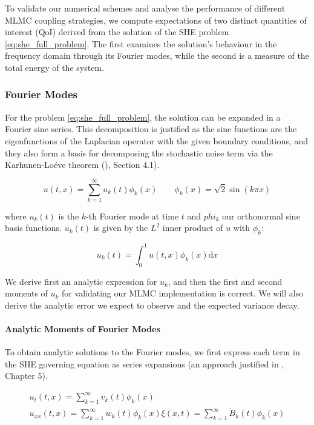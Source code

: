 To validate our numerical schemes and analyse the performance 
of different MLMC coupling strategies, we compute expectations
of two distinct quantities of interest (QoI) derived from the solution 
of the SHE problem \eqref{eq:she_full_problem}.
The first examines the solution's behaviour in the frequency domain through 
its Fourier modes, while the second is a measure of the total energy of the 
system. 

\subsubsection{Fourier Modes}

For the problem \eqref{eq:she_full_problem}, 
the solution can be expanded in a Fourier sine series. This 
decomposition is justified 
as the sine functions are the eigenfunctions of the Laplacian 
operator with the given boundary conditions, and they also form a basis 
for decomposing the stochastic noise term via the Karhunen-Loéve theorem
()\cite{da2014stochastic}, Section 4.1).

\begin{equation}
    u(t,x) = \sum_{k=1}^\infty u_k(t)\phi_k(x) \qquad \phi_k(x) = \sqrt{2}\sin (k\pi x)
\end{equation}

where $u_k(t)$ is the $k$-th Fourier mode at time $t$ and $phi_k$ our 
orthonormal sine basis functions. $u_k(t)$ is given by the $L^2$ 
inner product of $u$ with $\phi_k$:

\begin{equation}
    u_k(t) = \int_0^1 u(t,x)\phi_k(x)\mathrm{d}x
\end{equation}

We derive first an analytic expression for $u_k$, 
and then the first and second moments of $u_k$ for validating our 
MLMC implementation is correct. We will also derive the 
analytic error we expect to observe and 
the expected variance decay. 

\paragraph{Analytic Moments of Fourier Modes}

To obtain analytic solutions to the Fourier modes, we first express each term 
in the SHE governing equation as series expansions (an approach justified 
in \cite{strauss2007partial}, Chapter 5).

\begin{align}
    u_t(t,x) = \sum_{k=1}^\infty v_k(t)\phi_k(x) \\
    u_{xx}(t,x) = \sum_{k=1}^\infty w_k(t)\phi_k(x)
    \xi(x,t) = \sum_{k=1}^\infty  \dot{B}_k(t) \phi_k(x)
\end{align}

